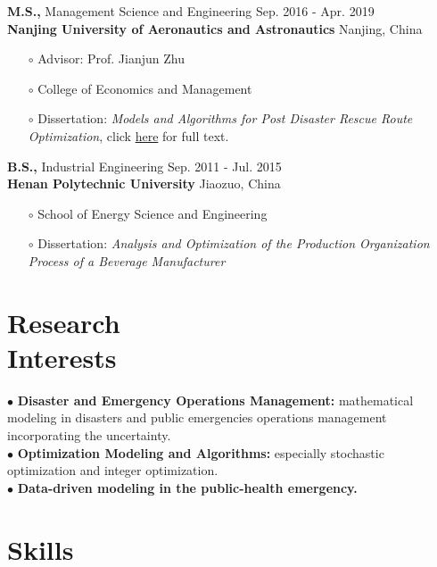\documentclass[margin]{res}
\begin{document}
\begin{resume}
{\bf M.S.,}  Management Science and Engineering \hfill Sep. 2016 - Apr. 2019 \\
{\bf Nanjing University of Aeronautics and Astronautics} \hfill Nanjing, China
\begin{itemize}  \itemsep -2pt  %
\item[\(\circ\)] Advisor: Prof. Jianjun Zhu
\item[\(\circ\)] College of Economics and Management
\item[\(\circ\)] Dissertation: {\it Models and Algorithms for Post Disaster Rescue Route Optimization}, click \href{https://docs.google.com/viewer?url=https://github.com/phguo/phguo.github.io/raw/master/full_text/zh-MasterThesis.pdf}{here} for full text.
\end{itemize}\vspace{-.5em}

{\bf B.S.,}  Industrial Engineering \hfill Sep. 2011 - Jul. 2015 \\
{\bf Henan Polytechnic University} \hfill Jiaozuo, China
\begin{itemize}   \itemsep -2pt  %
\item[\(\circ\)] School of Energy Science and Engineering
\item[\(\circ\)] Dissertation: {\it Analysis and Optimization of the Production Organization Process of a Beverage Manufacturer}
\end{itemize}





\section{\sc Research \\Interests}

$\bullet$ {\bf Disaster and Emergency Operations Management:} mathematical modeling in disasters and public emergencies operations management incorporating the uncertainty. \\
$\bullet$ {\bf Optimization Modeling and Algorithms:} especially stochastic optimization and integer optimization. \\
$\bullet$ {\bf Data-driven modeling in the public-health emergency.}





\section{\sc Skills}


\end{resume}
\end{document}
